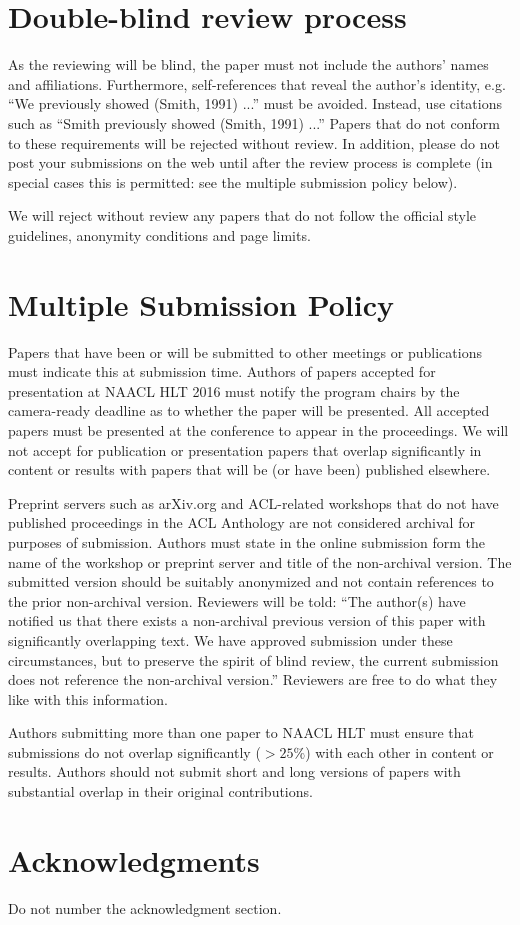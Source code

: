 \documentclass[11pt,letterpaper]{article}
\begin{document}
\section{Double-blind review process}
\label{sec:blind}

As the reviewing will be blind, the paper must not include the
authors' names and affiliations.  Furthermore, self-references that
reveal the author's identity, e.g. ``We previously showed (Smith,
1991) ...'' must be avoided. Instead, use citations such as ``Smith
previously showed (Smith, 1991) ...'' Papers that do not conform to
these requirements will be rejected without review. In addition,
please do not post your submissions on the web until after the
review process is complete (in special cases this is permitted: see 
the multiple submission policy below).

We will reject without review any papers that do not follow the
official style guidelines, anonymity conditions and page limits.

\section{Multiple Submission Policy}

Papers that have been or will be submitted to other meetings or
publications must indicate this at submission time. Authors of
papers accepted for presentation at NAACL HLT 2016 must notify the
program chairs by the camera-ready deadline as to whether the paper
will be presented. All accepted papers must be presented at the
conference to appear in the proceedings. We will not accept for
publication or presentation papers that overlap significantly in
content or results with papers that will be (or have been) published
elsewhere.

Preprint servers such as arXiv.org and ACL-related workshops that
do not have published proceedings in the ACL Anthology are not
considered archival for purposes of submission. Authors must state
in the online submission form the name of the workshop or preprint
server and title of the non-archival version.  The submitted version
should be suitably anonymized and not contain references to the
prior non-archival version. Reviewers will be told: ``The author(s)
have notified us that there exists a non-archival previous version
of this paper with significantly overlapping text. We have approved
submission under these circumstances, but to preserve the spirit
of blind review, the current submission does not reference the
non-archival version.'' Reviewers are free to do what they like with
this information.

Authors submitting more than one paper to NAACL HLT must ensure
that submissions do not overlap significantly ($>25\%$) with each other
in content or results. Authors should not submit short and long
versions of papers with substantial overlap in their original
contributions.

\section*{Acknowledgments}

Do not number the acknowledgment section.



\end{document}
